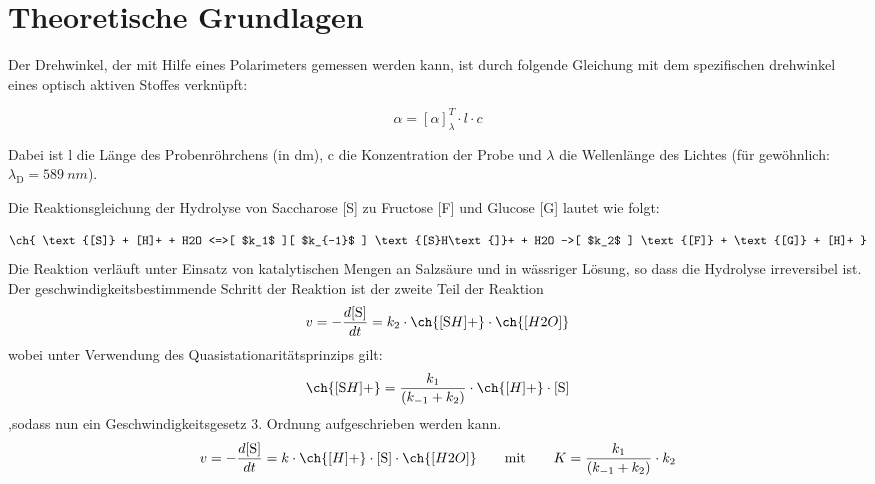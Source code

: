 \setlength\abovedisplayshortskip{20pt}
\setlength\belowdisplayshortskip{20pt}
\setlength\abovedisplayskip{20pt}
\setlength\belowdisplayskip{20pt}

\section{Theoretische Grundlagen \cite{wedler}}


Der Drehwinkel, der mit Hilfe eines Polarimeters gemessen werden kann, ist durch folgende Gleichung mit dem spezifischen drehwinkel eines optisch aktiven Stoffes verknüpft:

\begin{equation}
\alpha=\left[\alpha\right]_\lambda^T \cdot l \cdot c
\end{equation}

Dabei ist l die Länge des Probenröhrchens (in dm), c die Konzentration der Probe und $\lambda$ die Wellenlänge des Lichtes (für gewöhnlich: $\lambda_\text{D}=589~\si{nm}$).

Die Reaktionsgleichung der Hydrolyse von Saccharose [S] zu Fructose [F] und Glucose [G] lautet wie folgt: 

\begin{equation}
\ch{ \text{[S]} + [H]+ + H2O <=>[ $k_1$ ][ $k_{-1}$ ] \text{[S}H\text{]}+ + H2O ->[ $k_2$ ] \text{[F]} + \text{[G]} + [H]+  }
\end{equation}
Die Reaktion verläuft unter Einsatz von katalytischen Mengen an Salzsäure und in wässriger Lösung, so dass die Hydrolyse irreversibel ist. Der geschwindigkeitsbestimmende Schritt der Reaktion ist der zweite Teil der Reaktion
\begin{align}
v = - \frac{d \text{[S]}}{dt}= k_2 \cdot \ch{\text{[S}H\text{]}+} \cdot \ch{[H2O]}
\end{align}
wobei unter Verwendung des Quasistationaritätsprinzips gilt:
\begin{align}
\ch{\text{[S}H\text{]}+}=\frac{k_1}{\left(k_{-1} + k_2\right)}
 \cdot \ch{\text{[}H\text{]}+} \cdot \text{[S]}
\end{align}
,sodass nun ein Geschwindigkeitsgesetz 3. Ordnung aufgeschrieben werden kann.
\begin{align}
v = - \frac{d \text{[S]}}{dt}= k \cdot \ch{\text{[}H\text{]}+} \cdot \text{[S]} \cdot \ch{[H2O]}
\quad\quad \text{mit}\quad\quad  K=\frac{k_1}{\left(k_{-1} + k_2\right)}
 \cdot k_2
\end{align}

